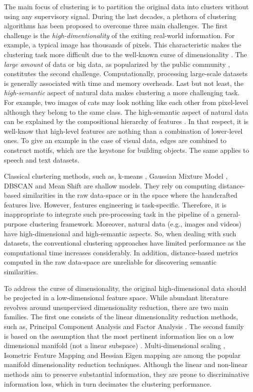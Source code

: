 \documentclass{article}
\begin{document}
The main focus of clustering is to partition the original data into clusters without using any supervisory signal. During the last decades, a plethora of clustering algorithms has been proposed to overcome three main challenges. The first challenge is the \textit{high-dimentionality} of the exiting real-world information. For example, a typical image has thousands of pixels. This characteristic makes the clustering task more difficult due to the well-known curse of dimensionality \cite{paper56}. The \textit{large amount} of data or big data, as popularized by the public community \cite{paper57}, constitutes the second challenge. Computationally, processing large-scale datasets is generally associated with time and memory overheads. Last but not least, the \textit{high-semantic} aspect of natural data makes clustering a more challenging task. For example, two images of cats may look nothing like each other from pixel-level although they belong to the same class. The high-semantic aspect of natural data can be explained by the compositional hierarchy of features \cite{paper20}. In that respect, it is well-know that high-level features are nothing than a combination of lower-level ones. To give an example in the case of visual data, edges are combined to construct motifs, which are the keystone for building objects. The same applies to speech and text datasets.

Classical clustering methods, such as, k-means \cite{paper14}, Gaussian Mixture Model \cite{paper47}, DBSCAN \cite{paper48} and Mean Shift \cite{paper15} are shallow models. They rely on computing distance-based similarities in the raw data-space or in the space where the handcrafted features live. However, features engineering is task-specific. Therefore, it is inappropriate to integrate such pre-processing task in the pipeline of a general-purpose clustering framework. Moreover, natural data (e.g., images and videos) have high-dimensional and high-semantic aspects. So, when dealing with such datasets, the conventional clustering approaches have limited performance as the computational time increases considerably. In addition, distance-based metrics computed in the raw data-space are unreliable for discovering semantic similarities. 



To address the curse of dimensionality, the original high-dimensional data should be projected in a low-dimensional feature space. While abundant literature revolves around unsupervised dimensionality reduction, there are two main families. The first one consists of the linear dimensionality reduction methods, such as, Principal Component Analysis \cite{paper49} and Factor Analysis \cite{paper50}. The second family is based on the assumption that the most pertinent information lies on a low dimensional manifold (not a linear subspace) \cite{paper52}. Multi-dimensional scaling \cite{paper51}, Isometric Feature Mapping \cite{paper52} and Hessian Eigen mapping \cite{paper53} are among the popular manifold dimensionality reduction techniques. Although the linear and non-linear methods aim to preserve substantial information, they are prone to discriminative information loss, which in turn decimates the clustering performance. 
\end{document}

